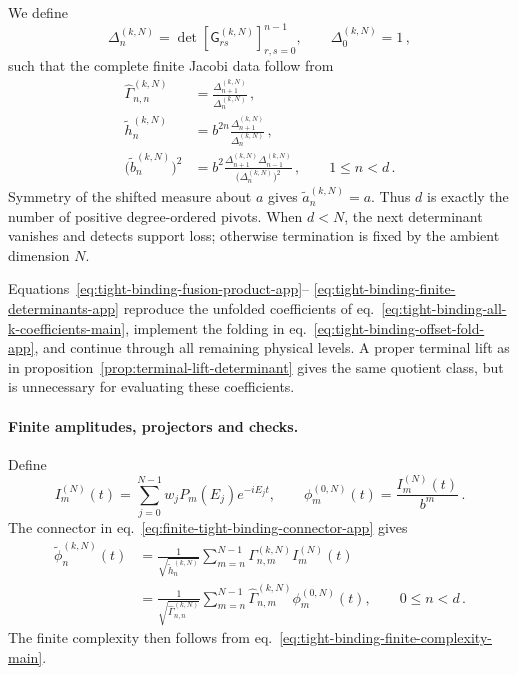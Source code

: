 \documentclass[a4paper,11pt]{article}
\def\ii{i}%
\def\ee{e}%
\theoremstyle{definition}
\theoremstyle{remark}
\newcommand{\ii}{\mathrm i}
\newcommand{\ee}{\mathrm e}
\newcommand{\tphi}{\widetilde\phi}
\newcommand{\thh}{\widetilde h}
\begin{document}
We define
\begin{equation}
   \Delta_n^{(k,N)}
   =
   \det\!\left[
      \mathsf G_{rs}^{(k,N)}
   \right]_{r,s=0}^{n-1},
   \qquad
   \Delta_0^{(k,N)}=1\,,
\end{equation}
such that the complete finite Jacobi data follow from
\begin{equation}
\begin{aligned}
   \widehat\Gamma_{n,n}^{(k,N)}
   &=\frac{\Delta_{n+1}^{(k,N)}}{\Delta_n^{(k,N)}}\,,\\
   \thh_n^{(k,N)}
   &=b^{2n}\frac{\Delta_{n+1}^{(k,N)}}{\Delta_n^{(k,N)}}\,,\\
   \bigl(\widetilde b_n^{(k,N)}\bigr)^2
   &=
   b^2
   \frac{\Delta_{n+1}^{(k,N)}\Delta_{n-1}^{(k,N)}}
        {\bigl(\Delta_n^{(k,N)}\bigr)^2}\,,
   \qquad 1\le n<d\,.
\end{aligned}
   \label{eq:tight-binding-finite-determinants-app}
\end{equation}
Symmetry of the shifted measure about $a$ gives
$\widetilde a_n^{(k,N)}=a$.  Thus $d$ is exactly the number of positive
degree-ordered pivots.  When $d<N$, the next determinant vanishes and
detects support loss; otherwise termination is fixed by the ambient
dimension $N$.

Equations~\eqref{eq:tight-binding-fusion-product-app}--
\eqref{eq:tight-binding-finite-determinants-app} reproduce the unfolded
coefficients of
eq.~\eqref{eq:tight-binding-all-k-coefficients-main}, implement the
folding in eq.~\eqref{eq:tight-binding-offset-fold-app}, and continue
through all remaining physical levels.  A proper terminal lift as in
proposition~\ref{prop:terminal-lift-determinant} gives the same quotient
class, but is unnecessary for evaluating these coefficients.

\paragraph{Finite amplitudes, projectors and checks.}
Define
\begin{equation}
   I_m^{(N)}(t)
   =\sum_{j=0}^{N-1}w_jP_m(E_j)\ee^{-\ii E_jt},
   \qquad
   \phi_m^{(0,N)}(t)=\frac{I_m^{(N)}(t)}{b^m}\,.
\end{equation}
The connector in
eq.~\eqref{eq:finite-tight-binding-connector-app} gives
\begin{equation}
\begin{aligned}
   \tphi_n^{(k,N)}(t)
   &=
   \frac{1}{\sqrt{\thh_n^{(k,N)}}}
   \sum_{m=n}^{N-1}
   \Gamma_{n,m}^{(k,N)}I_m^{(N)}(t)\\
   &=
   \frac{1}{\sqrt{\widehat\Gamma_{n,n}^{(k,N)}}}
   \sum_{m=n}^{N-1}
   \widehat\Gamma_{n,m}^{(k,N)}
   \phi_m^{(0,N)}(t),
   \qquad 0\le n<d\,.
\end{aligned}
   \label{eq:finite-tight-binding-amplitude-complexity-app}
\end{equation}
The finite complexity then follows from
eq.~\eqref{eq:tight-binding-finite-complexity-main}.
\end{document}
